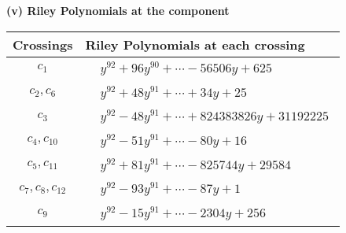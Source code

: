 \documentclass[1p]{elsarticle_modified}
\theoremstyle{definition}
\begin{document}
\newpage\renewcommand{\arraystretch}{1}
\flushleft \textbf{(v) Riley Polynomials at the component}\newline \\
\begin{tabular}{m{50pt}|m{274pt}}
Crossings & \hspace{64pt}Riley Polynomials at each crossing \\
\hline $$\begin{aligned}c_{1}\end{aligned}$$&$\begin{aligned}
&y^{92}+96 y^{90}+\cdots-56506 y+625
\end{aligned}$\\
\hline $$\begin{aligned}c_{2},c_{6}\end{aligned}$$&$\begin{aligned}
&y^{92}+48 y^{91}+\cdots+34 y+25
\end{aligned}$\\
\hline $$\begin{aligned}c_{3}\end{aligned}$$&$\begin{aligned}
&y^{92}-48 y^{91}+\cdots+824383826 y+31192225
\end{aligned}$\\
\hline $$\begin{aligned}c_{4},c_{10}\end{aligned}$$&$\begin{aligned}
&y^{92}-51 y^{91}+\cdots-80 y+16
\end{aligned}$\\
\hline $$\begin{aligned}c_{5},c_{11}\end{aligned}$$&$\begin{aligned}
&y^{92}+81 y^{91}+\cdots-825744 y+29584
\end{aligned}$\\
\hline $$\begin{aligned}c_{7},c_{8},c_{12}\end{aligned}$$&$\begin{aligned}
&y^{92}-93 y^{91}+\cdots-87 y+1
\end{aligned}$\\
\hline $$\begin{aligned}c_{9}\end{aligned}$$&$\begin{aligned}
&y^{92}-15 y^{91}+\cdots-2304 y+256
\end{aligned}$\\
\hline
\end{tabular}\\~\\
\end{document}
